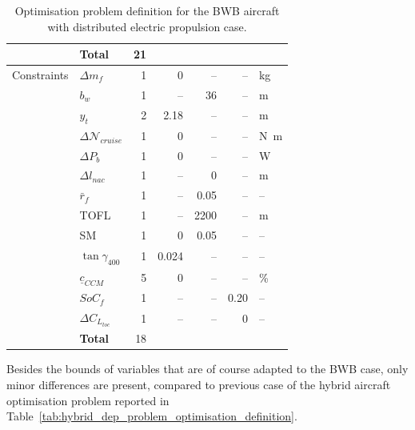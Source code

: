 \begin{table}[h!]
\begin{tabular}{l l r r r r l}
		& \textbf{Total} & 21 & & & & \\
		\hline
		Constraints & $\Delta m_{f}$ & 1 & 0 & -- & -- & \si{\kilogram} \\
		& $b_w$ & 1 & -- & \num{36} & -- & \si{\meter} \\
		& $y_t$ & 2 & 2.18 & -- & -- & \si{\meter} \\
		& $\Delta \mathcal{N}_{cruise}$ & 1 & \num{0} & -- & -- & \si{\newton\meter} \\
		& $\Delta P_{b}$ & 1 & \num{0} & -- & -- & \si{\watt} \\
		& $\Delta l_{nac}$ & 1 & -- & \num{0} & -- & \si{\meter} \\
		& $\bar{r}_f$ & 1 & -- & \num{0.05} & -- & -- \\
		& TOFL & 1 & -- & \num{2200} & -- & \si{\meter} \\
		& SM & 1 & \num{0} & \num{0.05} & -- & -- \\
		& $\tan \gamma_{400}$ & 1 & \num{0.024} & -- & -- & -- \\
		& $\underline{c}_{CCM}$ & 5 & \num{0} & -- & -- & \% \\
		& $SoC_f$ & 1 & -- & -- & \num{0.20} & -- \\
		& $\Delta C_{L_{toc}}$ & 1 & -- & -- & 0 & -- \\
		& \textbf{Total} & 18 & & & & \\
		\hline    	
	\end{tabular} 
	\caption{Optimisation problem definition for the BWB aircraft with distributed electric propulsion case.}
	\label{tab:bwb_hybrid_dep_problem_optimisation_definition}
\end{table}
Besides the bounds of variables that are of course adapted to the BWB case, only minor differences are present, compared to previous case of the hybrid aircraft optimisation problem reported in Table~\ref{tab:hybrid_dep_problem_optimisation_definition}.
